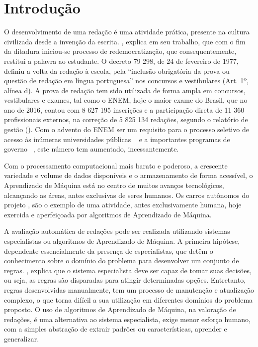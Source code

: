 \newpage
\section{Introdução}

O desenvolvimento de uma redação é uma atividade prática, presente na 
cultura civilizada desde a invenção da escrita. , 
explica em seu trabalho, que com o fim da ditadura iniciou-se processo de 
redemocratização, que consequentemente, restitui a palavra ao estudante. 
O decreto 79 298, de 24 de fevereiro de 1977, definiu a volta da redação à 
escola, pela ``inclusão obrigatória da prova ou questão de redação em língua 
portuguesa'' nos concursos e vestibulares (Art. 1º, alínea d). A prova de 
redação tem sido utilizada de forma ampla em concursos, vestibulares e exames, 
tal como o ENEM, hoje o maior exame do Brasil, que no ano de 2016, contou com 
8 627 195 inscrições e a participação direta de 11 360 profissionais externos, 
na correção de 5 825 134 redações, segundo o relatório de gestão 
\citeauthor{relatorio_de_gestao:2016} (\citeyear{relatorio_de_gestao:2016}). 
Com o advento do ENEM ser um requisito para o processo seletivo de acesso às 
inúmeras universidades públicas ~\cite{sisu:2017} e a importantes programas de 
governo ~\cite{csf:2017}, este número tem aumentado, incessantemente.

Com o processamento computacional mais barato e poderoso, a crescente variedade 
e volume de dados disponíveis e o armazenamento de forma acessível, o 
Aprendizado de Máquina está no centro de muitos avanços tecnológicos, 
alcançando as áreas, antes exclusivas de seres humanos. Os carros autônomos do
projeto , são o exemplo de uma atividade, antes 
exclusivamente humana, hoje exercida e aperfeiçoada por algoritmos de 
Aprendizado de Máquina. 

A avaliação automática de redações pode ser realizada utilizando sistemas
especialistas ou algoritmos de Aprendizado de Máquina. A primeira hipótese, 
dependente essencialmente da presença de especialistas, que detêm o 
conhecimento sobre o domínio do problema para desenvolver um conjunto de 
regras. , explica que o sistema 
especialista deve ser capaz de tomar suas decisões, ou seja, as regras são 
disparadas para atingir determinadas opções. Entretanto, regras desenvolvidas 
manualmente, tem um processo de manutenção e atualização complexo, o que torna 
difícil a sua utilização em diferentes domínios do problema proposto. O uso de 
algoritmos de Aprendizado de Máquina, na valoração de redações, é uma 
alternativa ao sistema especialista, exige menor esforço humano, com a simples 
abstração de extrair padrões ou características, aprender e generalizar. 

